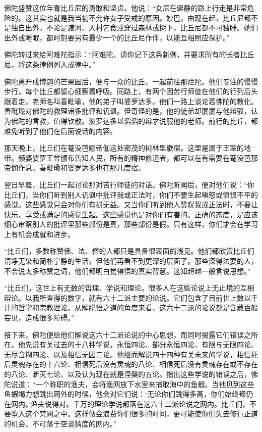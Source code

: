 \documentclass[12pt,twoside,openany]{book}
\begin{document}
佛陀盛赞这位年青比丘尼的勇敢和坚贞。他说：“女尼在僻静的路上行走是非常危险的。这其实也就是我当初不允许女子受戒的原因。妙巴，由现在起，比丘尼都不是独自出外。不论是渡河、入村乞食或穿过森林或树下，比丘尼都不可独睡。她们出外或睡眠，都时刻要另有最少一个的比丘尼作伴，以能互相照应保护。”

佛陀转过来给阿难陀指示：“阿难陀，请你记下这条新例，并要求所有的长者比丘尼，将这条律例列入戒律中。”

佛陀离开戌博迦的芒果园后，便与一众的比丘，一起前往那烂陀。他们专注的慢慢步行。每个比丘都留心细察着呼吸。同路上，有两个因苦行师徒在他们的行列后头跟着走。老师名叫善毗瑜，他的弟子叫婆罗达多。他们一路上谈论着佛陀的教化。善毗瑜对佛陀的教理诸多批评和讥讽。但奇怪的是，他的徒弟却屡屡与他辩驳，认为佛陀的言教，值得钦敬。波罗达多以滔滔的辩才说服他的老师。前行的比丘，都难免听到了他们在后面说话的内容。

那天晚上，比丘们在菴没芭娜帝伽这处密茂的树林里歇宿。这里是属于王室的地带。频婆娑罗王曾颁布告知人民，所有的精神修道者，都可以在有需要在菴没芭那帝伽作息。善毗瑜和婆罗达多也在那儿度宿。

翌日早晨，比丘们一起讨论那对苦行师徒的对话。佛陀听闻后，便对他们说：“你比丘们，当你们听到别人讥讽中批评我或正法时，你们不要生起嗔怒或愤恨不平的感觉。这些感觉只会对你们有损无益。又当你们听到他人赞叹我或正法时，不要让快乐、享受或满足的感觉生起。这些感觉也是对你们有害的。正确的态度，是应该细心审察别人的批评里那些部份是真，那些部份是假。只有这样，你们才会在学习上有机会成就和进步。

“比丘们，多数称赞佛、法、僧的人都只是具备很表面的浅见。他们都欣赏比丘们清净无染和简朴宁静的生活，但他们再看不到更深的层面了。那些深得法要的人，不会说太多称赞之词，他们都明白觉得悟的真实智慧。这知超越一般言说思想。”

“比丘们，这世上有无数的哲理、学说和理论。很多人在这些论说上无止境的互相辩论。以我所查得的数字，就有六十二派主要的论说。它们包含了目前世上数以千计的哲学和宗教理论。从解脱悟之道的角度来看，这六十二派的论说都是含藏百般妄见，造成很多障碍。”

接下来，佛陀便给他们解说这六十二派论说的中心思想，而同时揭露它们错误之所在。他先说有关过去的十八种学说，永恒四论、部分永恒四论、有限与无限四论、无尽含糊四论、以及相信无因二论。他继而解说四十四种有关未来的学说，相信死后灵魂存在的十六论、相信死后没有灵魂的八论、相信死后没有灵魂存在或不存在的八论、断灭七论、以及认为现在就是涅槃的五论。指出这些学说的错误之后，佛陀说道：“一个称职的渔夫，会将渔网放下水里来捕取海中的鱼蝦。当他见到这些鱼蝦竭力想跳出网外的时候，他会对它们说：‘无论你们跳得多高，你们始终都仍在网内。’渔夫说得对。千万的理论学说都落在这六十二派论说之网内。比丘们，不要堕入这个梵网之中。这样做会浪费你们很多的时间，更可能使你们失去修行正道的机会。不可落于空谈猜度的网内。”
\end{document}
